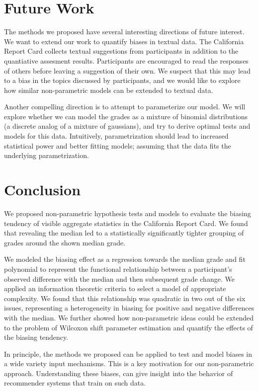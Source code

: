 \section{Future Work}
The methods we proposed have several interesting directions of future interest. 
We want to extend our work to quantify biases in textual data. 
The California Report Card collects textual suggestions from participants in addition to the quantiative assesment results. 
Participants are encouraged to read the responses of others before leaving a suggestion of their own.
We suspect that this may lead to a bias in the topics discussed by participants, and we would like to explore how similar non-parametric models can be extended to textual data.

Another compelling direction is to attempt to parameterize our model.
We will explore whether we can model the grades as a mixture of binomial distributions (a discrete analog of a mixture of gaussians), and try to derive optimal tests and models for this data.
Intuitively, parametrization should lead to increased statistical power and better fitting models; assuming that the data fits the underlying parametrization.

\section{Conclusion}
We proposed non-parametric hypothesis tests and models to evaluate the biasing tendency of visible aggregate statistics in the California Report Card.
We found that revealing the median led to a statistically significantly tighter grouping of grades around the shown median grade.

We modeled the biasing effect as a regression towards the median grade and fit polynomial to represent the functional relationship between a participant's observed difference with the median and then subsequent grade change.
We applied an information theoretic criteria to select a model of appropriate complexity.
We found that this relationship was quadratic in two out of the six issues, representing a heterogeneity in biasing for positive and negative differences with the median.
We further showed how non-parametric ideas could be extended to the problem of Wilcoxon shift parameter estimation and quantify the effects of the biasing tendency.

In principle, the methods we proposed can be applied to test and model biases in a wide variety input mechanisms.
This is a key motivation for our non-parametric approach.
Understanding these biases, can give insight into the behavior of recommender systems that train on such data.
